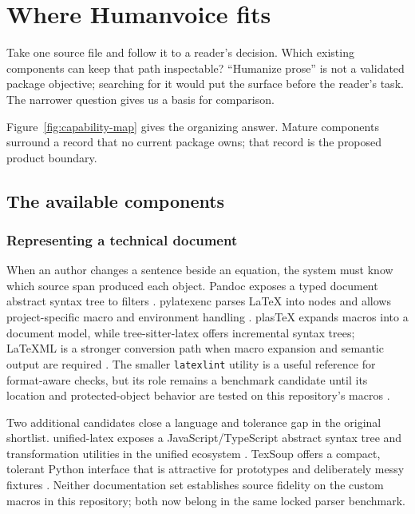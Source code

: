 \chapter{Where Humanvoice fits}
\label{ch:field}

Take one source file and follow it to a reader's decision. Which existing
components can keep that path inspectable? ``Humanize prose'' is not a validated
package objective; searching for it would put the surface before the reader's
task. The narrower question gives us a basis for comparison.

Figure~\ref{fig:capability-map} gives the organizing answer. Mature components
surround a record that no current package owns; that record is the proposed
product boundary.

\hvFigureCapabilityMap

\section{The available components}

\subsection{Representing a technical document}

When an author changes a sentence beside an equation, the system must know
which source span produced each object. Pandoc exposes a typed document
abstract syntax tree to filters \citep{pandoc2026filters}. pylatexenc parses
LaTeX into nodes and allows project-specific macro and environment handling
\citep{pylatexenc2026}. plasTeX expands macros into a document model, while
tree-sitter-latex offers incremental syntax trees; LaTeXML is a stronger
conversion path when macro expansion and semantic output are required
\citep{plastex2026,treesitterlatex2026,latexml2026}. The smaller
\texttt{latexlint} utility is a useful reference for format-aware checks, but
its role remains a benchmark candidate until its location and protected-object
behavior are tested on this repository's macros \citep{latexlint2026}.

Two additional candidates close a language and tolerance gap in the original
shortlist. unified-latex exposes a JavaScript/TypeScript abstract syntax tree
and transformation utilities in the unified ecosystem
\citep{unifiedlatex2026}. TexSoup offers a compact, tolerant Python interface
that is attractive for prototypes and deliberately messy fixtures
\citep{texsoup2026}. Neither documentation set establishes source fidelity on
the custom macros in this repository; both now belong in the same locked
parser benchmark.

